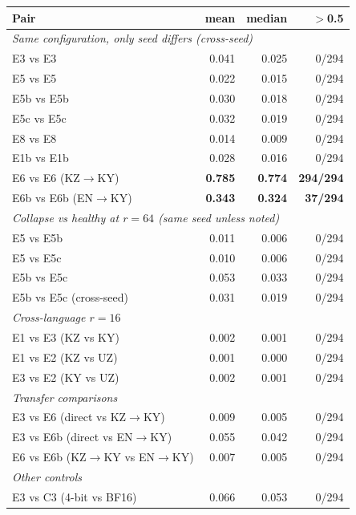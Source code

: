 \documentclass[11pt]{article}
\begin{document}
\begin{table}[t]
\centering
\small
\begin{tabular}{lrrr}
\toprule
\textbf{Pair} & \textbf{mean} & \textbf{median} & \textbf{$>$0.5} \\
\midrule
\multicolumn{4}{l}{\emph{Same configuration, only seed differs (cross-seed)}}\\
E3 vs E3       & 0.041 & 0.025 & 0/294\\
E5 vs E5       & 0.022 & 0.015 & 0/294\\
E5b vs E5b     & 0.030 & 0.018 & 0/294\\
E5c vs E5c     & 0.032 & 0.019 & 0/294\\
E8 vs E8       & 0.014 & 0.009 & 0/294\\
E1b vs E1b     & 0.028 & 0.016 & 0/294\\
\rowcolor{gray!15} E6 vs E6 (KZ$\rightarrow$KY)  & \textbf{0.785} & \textbf{0.774} & \textbf{294/294}\\
\rowcolor{gray!15} E6b vs E6b (EN$\rightarrow$KY) & \textbf{0.343} & \textbf{0.324} & \textbf{37/294}\\
\midrule
\multicolumn{4}{l}{\emph{Collapse vs healthy at $r{=}64$ (same seed unless noted)}}\\
E5 vs E5b      & 0.011 & 0.006 & 0/294\\
E5 vs E5c      & 0.010 & 0.006 & 0/294\\
E5b vs E5c     & 0.053 & 0.033 & 0/294\\
E5b vs E5c (cross-seed) & 0.031 & 0.019 & 0/294\\
\midrule
\multicolumn{4}{l}{\emph{Cross-language $r{=}16$}}\\
E1 vs E3 (KZ vs KY) & 0.002 & 0.001 & 0/294\\
E1 vs E2 (KZ vs UZ) & 0.001 & 0.000 & 0/294\\
E3 vs E2 (KY vs UZ) & 0.002 & 0.001 & 0/294\\
\midrule
\multicolumn{4}{l}{\emph{Transfer comparisons}}\\
E3 vs E6  (direct vs KZ$\rightarrow$KY) & 0.009 & 0.005 & 0/294\\
E3 vs E6b (direct vs EN$\rightarrow$KY) & 0.055 & 0.042 & 0/294\\
E6 vs E6b (KZ$\rightarrow$KY vs EN$\rightarrow$KY) & 0.007 & 0.005 & 0/294\\
\midrule
\multicolumn{4}{l}{\emph{Other controls}}\\
E3 vs C3 (4-bit vs BF16)   & 0.066 & 0.053 & 0/294\\

\end{tabular}
\end{table}
\end{document}
